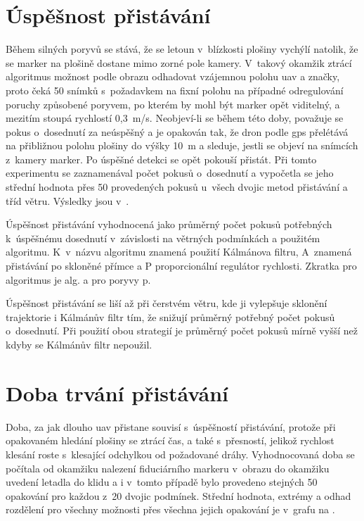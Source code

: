   \section{Úspěšnost přistávání} \label{sec:uspesnost}
    Během silných poryvů se stává, že se letoun v~blízkosti plošiny vychýlí natolik, že se marker na plošině dostane mimo zorné pole kamery. V~takový okamžik ztrácí algoritmus možnost podle obrazu odhadovat vzájemnou polohu \acrshort{uav} a značky, proto čeká 50 snímků s~požadavkem na fixní polohu na případné odregulování poruchy způsobené poryvem, po kterém by mohl být marker opět viditelný, a mezitím stoupá rychlostí 0{,}3~m/s. {Neobjeví-li} se během této doby, považuje se pokus o~dosednutí za neúspěšný a je opakován tak, že dron podle \acrshort{gps} přelétává na přibližnou polohu plošiny do výšky 10~m a sleduje, jestli se objeví na snímcích z~kamery marker. Po úspěšné detekci se opět pokouší přistát. Při tomto experimentu se zaznamenával počet pokusů o~dosednutí a vypočetla se jeho střední hodnota přes 50 provedených pokusů u~všech dvojic metod přistávání a tříd větru. Výsledky jsou v~.

    \begin{table}[H]
      \centering
      
      \caption[Úspěšnost přistávání]{Úspěšnost přistávání vyhodnocená jako průměrný počet pokusů potřebných k~úspěšnému dosednutí v~závislosti na větrných podmínkách a použitém algoritmu. K~v~názvu algoritmu znamená použití Kálmánova filtru, A~znamená přistávání po skloněné přímce a P proporcionální regulátor rychlosti. Zkratka pro algoritmus je alg. a pro poryvy p.}
      \label{tab:uspesnost}
    \end{table}

    Úspěšnost přistávání se liší až při čerstvém větru, kde ji vylepšuje sklonění trajektorie i Kálmánův filtr tím, že snižují průměrný potřebný počet pokusů o~dosednutí. Při použití obou strategií je průměrný počet pokusů mírně vyšší než kdyby se Kálmánův filtr nepoužil.

  \section{Doba trvání přistávání}
    Doba, za jak dlouho \acrshort{uav} přistane souvisí s~úspěšností přistávání, protože při opakovaném hledání plošiny se ztrácí čas, a také s~přesností, jelikož rychlost klesání roste s~klesající odchylkou od požadované dráhy. Vyhodnocovaná doba se počítala od okamžiku nalezení fiduciárního markeru v~obrazu do okamžiku uvedení letadla do klidu a i v~tomto případě bylo provedeno stejných 50 opakování pro každou z~20 dvojic podmínek. Střední hodnota, extrémy a odhad rozdělení pro všechny možnosti přes všechna jejich opakování je v~grafu na .

